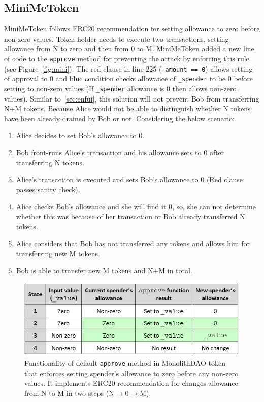 \subsection{MiniMeToken}\label{sec:MiniMeToken}
MiniMeToken\cite{Ref15} follows ERC20 recommendation for setting allowance to zero before non-zero values. Token holder needs to execute two transactions, setting allowance from N to zero and then from 0 to M. MiniMeToken added a new line of code to the \texttt{approve} method for preventing the attack by enforcing this rule (see Figure~\ref{fig:mini}). The red clause in line 225 (\texttt{\_amount == 0}) allows setting of approval to 0 and blue condition checks allowance of \texttt{\_spender} to be 0 before setting to non-zero values (\ie If \texttt{\_spender} allowance is 0 then allows non-zero values). Similar to~\ref{sec:enfui}, this solution will not prevent Bob from transferring N+M tokens. Because Alice would not be able to distinguish whether N tokens have been already drained by Bob or not. Considering the below scenario:
\begin{enumerate}
	\item Alice decides to set Bob’s allowance to 0.
	\item Bob front-runs Alice’s transaction and his allowance sets to 0 after transferring N tokens.
	\item Alice’s transaction is executed and sets Bob’s allowance to 0 (Red clause passes sanity check).
	\item Alice checks Bob’s allowance and she will find it 0, so, she can not determine whether this was because of her transaction or Bob already transferred N tokens.
	\item Alice considers that Bob has not transferred any tokens and allows him for transferring new M tokens.
	\item Bob is able to transfer new M tokens and N+M in total.
\end{enumerate}



\begin{figure}[t]
	\centering
	\includegraphics[width=1.0\linewidth]{figures/multiple_withdrawal_09.png}
	\caption{Functionality of default \texttt{approve} method in MonolithDAO token that enforces setting spender's allowance to zero before any non-zero values. It implements ERC20 recommendation for changes allowance from N to M in two steps (N$\rightarrow$0$\rightarrow$M).\label{fig:dao}}
\end{figure}

